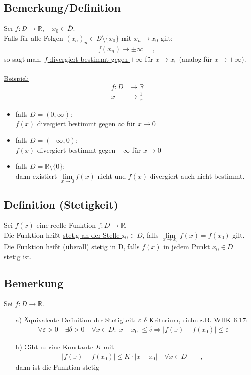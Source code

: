 \documentclass[12pt, titlepage]{article}
\newcommand{\R}{\mathds{R}}
\renewcommand{\*}{\cdot}
\renewcommand{\epsilon}{\varepsilon}
\begin{document}
	\subsection{Bemerkung/Definition}
	Sei $f\colon D\rightarrow\R,\quad x_0\in\overline{D}$.\\
	Falls für alle Folgen $(x_n)_n\in D\setminus\{x_0\}$ mit $x_n\rightarrow x_0$ gilt:
	\begin{align*}
		f(x_n)\rightarrow \pm\infty\quad\textrm{ , }
	\end{align*}
	so sagt man, \underline{$f$ divergiert bestimmt gegen $\pm\infty$} für $x\rightarrow x_0$ (analog für $x\rightarrow\pm\infty$).\\
	\\
	\underline{Beispiel:}
	\begin{align*}
		f\colon D&\rightarrow\R\\
		x&\mapsto\frac{1}{x}
	\end{align*}
	\begin{itemize}
		\item falls $D=(0,\infty)$:\\
		$f(x)$ divergiert bestimmt gegen $\infty$ für $x\rightarrow 0$ 
		\item falls $D=(-\infty,0)$:\\
		$f(x)$ divergiert bestimmt gegen $-\infty$ für $x\rightarrow 0$
		\item falls $D=\R\setminus\{0\}$:\\
		dann existiert $\lim\limits_{x\rightarrow0}f(x)$ nicht und $f(x)$ divergiert auch nicht bestimmt.
	\end{itemize}
	\subsection{Definition (Stetigkeit)}
	Sei $f(x)$ eine reelle Funktion $f\colon D\rightarrow\R$.\\
	Die Funktion heißt \underline{stetig an der Stelle $x_0\in D$}, falls $\lim\limits_{x\rightarrow x_0}f(x)=f(x_0)$ gilt.\\
	Die Funktion heißt (überall) \underline{stetig in D}, falls $f(x)$ in jedem Punkt $x_0\in D$ stetig ist.
	\subsection{Bemerkung}
	Sei $f\colon D\rightarrow\R$.
	\begin{itemize}
		\item[a)] Äquivalente Definition der Stetigkeit: $\epsilon$-$\delta$-Kriterium, siehe z.B. WHK 6.17:
		\begin{align*}
			\forall\epsilon>0\quad\exists\delta>0\quad\forall x\in D\colon|x-x_0|\leq\delta\Rightarrow|f(x)-f(x_0)|\leq\epsilon
		\end{align*}
		\item[b)] Gibt es eine Konstante $K$ mit
		\begin{align*}
			|f(x)-f(x_0)|\leq K\*|x-x_0|\quad\forall x\in D\qquad\textrm{, }
		\end{align*}
		dann ist die Funktion stetig.
	\end{itemize}
\end{document}
